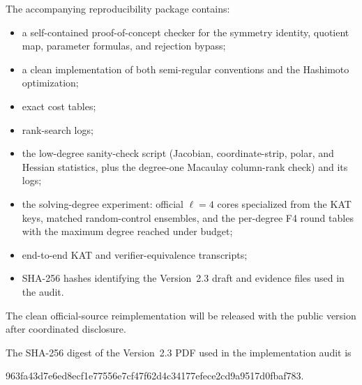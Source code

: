 \documentclass[11pt]{article}
\begin{document}
The accompanying reproducibility package contains:
\begin{itemize}
\item a self-contained proof-of-concept checker for the symmetry identity, quotient map, parameter formulas, and rejection bypass;
\item a clean implementation of both semi-regular conventions and the Hashimoto optimization;
\item exact cost tables;
\item rank-search logs;
\item the low-degree sanity-check script (Jacobian, coordinate-strip, polar, and Hessian statistics, plus the degree-one Macaulay column-rank check) and its logs;
\item the solving-degree experiment: official $\ell=4$ cores specialized from the KAT keys, matched random-control ensembles, and the per-degree F4 round tables with the maximum degree reached under budget;
\item end-to-end KAT and verifier-equivalence transcripts;
\item SHA-256 hashes identifying the Version~2.3 draft and evidence files used in the audit.
\end{itemize}
The clean official-source reimplementation will be released with the public version after coordinated disclosure.

The SHA-256 digest of the Version~2.3 PDF used in the implementation audit is
\begin{center}
\ttfamily\small 963fa43d7e6ed8ecf1e77556e7cf47f62d4c34177efece2cd9a9517d0fbaf783.
\end{center}

\printbibliography
\end{document}

